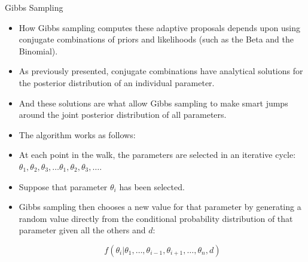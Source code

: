 \documentclass[handout]{beamer}
\begin{document}
\begin{frame}{Gibbs Sampling}
\scriptsize{

\begin{itemize}

\item How Gibbs sampling computes these adaptive proposals depends upon using conjugate combinations of priors and likelihoods (such as the Beta and the Binomial). 

\item As previously presented, conjugate combinations have analytical solutions for the posterior distribution of an individual parameter. 

\item And these solutions are what allow Gibbs sampling to make smart jumps around the joint posterior distribution of all parameters.

\item The algorithm works as follows:

\item At each point in the walk, the parameters are selected in an iterative cycle: $\theta_1, \theta_2, \theta_3 , \dots \theta_1, \theta_2, \theta_3, \dots.$ 

\item Suppose that parameter $\theta_i$ has been selected.

\item Gibbs sampling then chooses a new value for that parameter by generating a random value directly from
the conditional probability distribution of that parameter given all the others and $d$: 

\begin{displaymath}
f(\theta_i | \theta_1,\dots, \theta_{i-1}, \theta_{i+1}, \dots,\theta_n,d)  
\end{displaymath}





\end{itemize}


} 
\end{frame}
\end{document}
